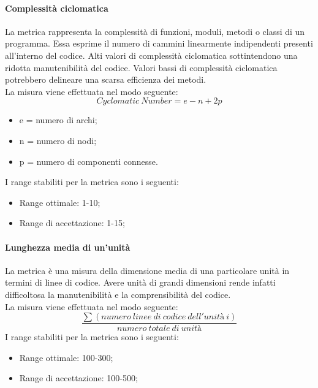 			\paragraph[Complessità ciclomatica]{\hypertarget{cci}{Complessità ciclomatica}}
			La metrica rappresenta la complessità di funzioni, moduli, metodi o classi di un programma. Essa esprime il numero di cammini linearmente indipendenti presenti all'interno del codice. Alti valori di complessità ciclomatica sottintendono una ridotta manutenibilità del codice. Valori bassi di complessità ciclomatica potrebbero delineare una scarsa efficienza dei metodi.
			\\La misura viene effettuata nel modo seguente:
			\begin{equation}
			Cyclomatic \ Number = e - n + 2p
			\end{equation}
			\begin{itemize}
				\item e = numero di archi;
				\item n = numero di nodi;
				\item p = numero di componenti connesse.
		    \end{itemize}
			I range stabiliti per la metrica sono i seguenti:
			\begin{itemize}
				\item Range ottimale: 1-10;
				\item Range di accettazione: 1-15;
			\end{itemize}
			
			\paragraph[Lunghezza media di un'unità]{\hypertarget{lmu}{Lunghezza media di un'unità}}
			La metrica è una misura della dimensione media di una particolare unità in termini di linee di codice. Avere unità di grandi dimensioni rende infatti difficoltosa la manutenibilità e la comprensibilità del codice.
			\\La misura viene effettuata nel modo seguente:
			\begin{equation}
				\frac{\sum(numero~linee~di~codice~dell'unità~i)}{numero~totale~di~unità}
			\end{equation}
			I range stabiliti per la metrica sono i seguenti:
			\begin{itemize}
				\item Range ottimale: 100-300;
				\item Range di accettazione: 100-500;
			\end{itemize}
			
